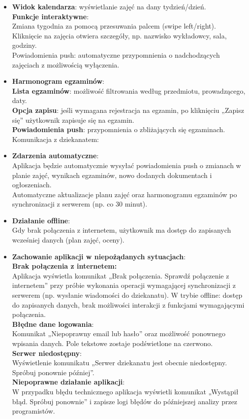 \begin{itemize}
\item \textbf{Widok kalendarza}: wyświetlanie zajęć na dany tydzień/dzień.
\\\textbf{Funkcje interaktywne}:
\\Zmiana tygodnia za pomocą przesuwania palcem (swipe left/right).
\\Kliknięcie na zajęcia otwiera szczegóły, np. nazwisko wykładowcy, sala, godziny.
\\Powiadomienia push: automatyczne przypomnienia o nadchodzących zajęciach z możliwością wyłączenia.

\item \textbf{Harmonogram egzaminów}:
\\\textbf{Lista egzaminów}: możliwość filtrowania według przedmiotu, prowadzącego, daty.
\\\textbf{Opcja zapisu}: jeśli wymagana rejestracja na egzamin, po kliknięciu „Zapisz się” użytkownik zapisuje się na egzamin.
\\\textbf{Powiadomienia push}: przypomnienia o zbliżających się egzaminach.
Komunikacja z dziekanatem:

\item \textbf{Zdarzenia automatyczne}:
\\Aplikacja będzie automatycznie wysyłać powiadomienia push o zmianach w planie zajęć, wynikach egzaminów, nowo dodanych dokumentach i ogłoszeniach.
\\Automatyczne aktualizacje planu zajęć oraz harmonogramu egzaminów po synchronizacji z serwerem (np. co 30 minut).
\item \textbf{Działanie offline}:
\\Gdy brak połączenia z internetem, użytkownik ma dostęp do zapisanych wcześniej danych (plan zajęć, oceny).
\item \textbf{Zachowanie aplikacji w niepożądanych sytuacjach}:
\\\textbf{Brak połączenia z internetem:}
\\Aplikacja wyświetla komunikat „Brak połączenia. Sprawdź połączenie z internetem” przy próbie wykonania operacji wymagającej synchronizacji z serwerem (np. wysłanie wiadomości do dziekanatu).
W trybie offline: dostęp do zapisanych danych, brak możliwości interakcji z funkcjami wymagającymi połączenia.
\\\textbf{Błędne dane logowania}:
\\Komunikat „Niepoprawny email lub hasło” oraz możliwość ponownego wpisania danych. Pole tekstowe zostaje podświetlone na czerwono.
\\\textbf{Serwer niedostępny}:
\\Wyświetlenie komunikatu „Serwer dziekanatu jest obecnie niedostępny. Spróbuj ponownie później”.
\\\textbf{Niepoprawne działanie aplikacji}:
\\W przypadku błędu technicznego aplikacja wyświetli komunikat „Wystąpił błąd. Spróbuj ponownie” i zapisze logi błędów do późniejszej analizy przez programistów.
\end{itemize}

